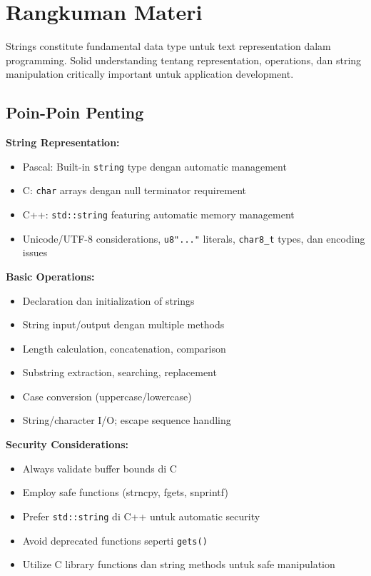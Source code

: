 \documentclass[../main.tex]{subfiles}
\begin{document}
\section{Rangkuman Materi}

Strings constitute fundamental data type untuk text representation dalam programming. Solid understanding tentang representation, operations, dan string manipulation critically important untuk application development.

\subsection{Poin-Poin Penting}

\textbf{String Representation:}
\begin{itemize}
  \item Pascal: Built-in \texttt{string} type dengan automatic management
  \item C: \texttt{char} arrays dengan null terminator requirement
  \item C++: \texttt{std::string} featuring automatic memory management
  \item Unicode/UTF-8 considerations, \texttt{u8"..."} literals, \texttt{char8\_t} types, dan encoding issues
\end{itemize}

\textbf{Basic Operations:}
\begin{itemize}
  \item Declaration dan initialization of strings
  \item String input/output dengan multiple methods
  \item Length calculation, concatenation, comparison
  \item Substring extraction, searching, replacement
  \item Case conversion (uppercase/lowercase)
  \item String/character I/O; escape sequence handling
\end{itemize}

\textbf{Security Considerations:}
\begin{itemize}
  \item Always validate buffer bounds di C
  \item Employ safe functions (strncpy, fgets, snprintf)
  \item Prefer \texttt{std::string} di C++ untuk automatic security
  \item Avoid deprecated functions seperti \texttt{gets()}
  \item Utilize C library functions dan string methods untuk safe manipulation
\end{itemize}
\end{document}
